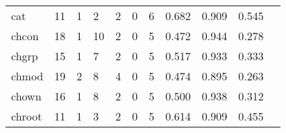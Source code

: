 \begin{longtable}{lp{1.2cm}p{1.2cm}p{1.2cm}p{1.2cm}p{1.2cm}p{1.2cm}p{1.2cm}p{1.2cm}p{1.2cm}p{1.2cm}}
cat       &                                    11 &                                                  1 &                                                  2 &                                                  2 &                                                  0 &                                                  6 &                                         0.682 &                                              0.909 &                                              0.545 \\
chcon     &                                    18 &                                                  1 &                                                 10 &                                                  2 &                                                  0 &                                                  5 &                                         0.472 &                                              0.944 &                                              0.278 \\
chgrp     &                                    15 &                                                  1 &                                                  7 &                                                  2 &                                                  0 &                                                  5 &                                         0.517 &                                              0.933 &                                              0.333 \\
chmod     &                                    19 &                                                  2 &                                                  8 &                                                  4 &                                                  0 &                                                  5 &                                         0.474 &                                              0.895 &                                              0.263 \\
chown     &                                    16 &                                                  1 &                                                  8 &                                                  2 &                                                  0 &                                                  5 &                                         0.500 &                                              0.938 &                                              0.312 \\
chroot    &                                    11 &                                                  1 &                                                  3 &                                                  2 &                                                  0 &                                                  5 &                                         0.614 &                                              0.909 &                                              0.455 \\

\end{longtable}
